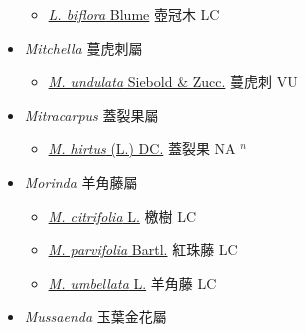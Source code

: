 \begin{itemize}
  \begin{itemize}
        \item[] \href{http://www.theplantlist.org/tpl1.1/search?q=Litosanthes+biflora}{\textit{L. biflora} Blume}   壺冠木 LC
  \end{itemize}
 \item[] \textit{Mitchella} 蔓虎刺屬
                    
  \begin{itemize}
        \item[] \href{http://www.theplantlist.org/tpl1.1/search?q=Mitchella+undulata}{\textit{M. undulata} Siebold \& Zucc.}   蔓虎刺 VU
  \end{itemize}
 \item[] \textit{Mitracarpus} 蓋裂果屬
                    
  \begin{itemize}
        \item[] \href{http://www.theplantlist.org/tpl1.1/search?q=Mitracarpus+hirtus}{\textit{M. hirtus} (L.) DC.}   蓋裂果 NA $^n$
  \end{itemize}
 \item[] \textit{Morinda} 羊角藤屬
                    
  \begin{itemize}
        \item[] \href{http://www.theplantlist.org/tpl1.1/search?q=Morinda+citrifolia}{\textit{M. citrifolia} L.}   檄樹 LC
        \item[] \href{http://www.theplantlist.org/tpl1.1/search?q=Morinda+parvifolia}{\textit{M. parvifolia} Bartl.}   紅珠藤 LC
        \item[] \href{http://www.theplantlist.org/tpl1.1/search?q=Morinda+umbellata}{\textit{M. umbellata} L.}   羊角藤 LC
  \end{itemize}
 \item[] \textit{Mussaenda} 玉葉金花屬
                    

\end{itemize}
